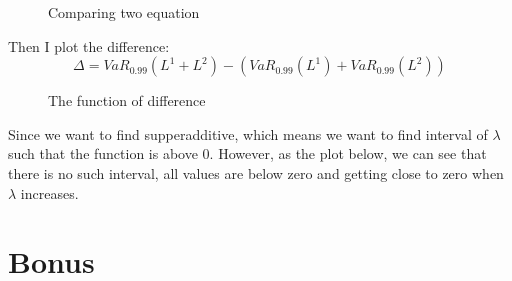\documentclass[letterpaper,11pt]{article}
\begin{document}
\begin{spacing}{1.2}
\begin{figure}[t]        
 \caption{\label{1} Comparing two equation}      
 \end{figure}

Then I plot the difference:
$$\Delta = VaR_{0.99}(L^1+L^2) - (VaR_{0.99}(L^1)+VaR_{0.99}(L^2))$$

\begin{figure}[t]        
 \caption{\label{1} The function of difference}      
 \end{figure}

Since we want to find supperadditive, which means we want to find interval of $\lambda$ such that the function is above $0$. However, as the plot below, we can see that there is no such interval, all values are below zero and getting close to zero when $\lambda$ increases.



\section*{Bonus}


\end{spacing}
\end{document}
